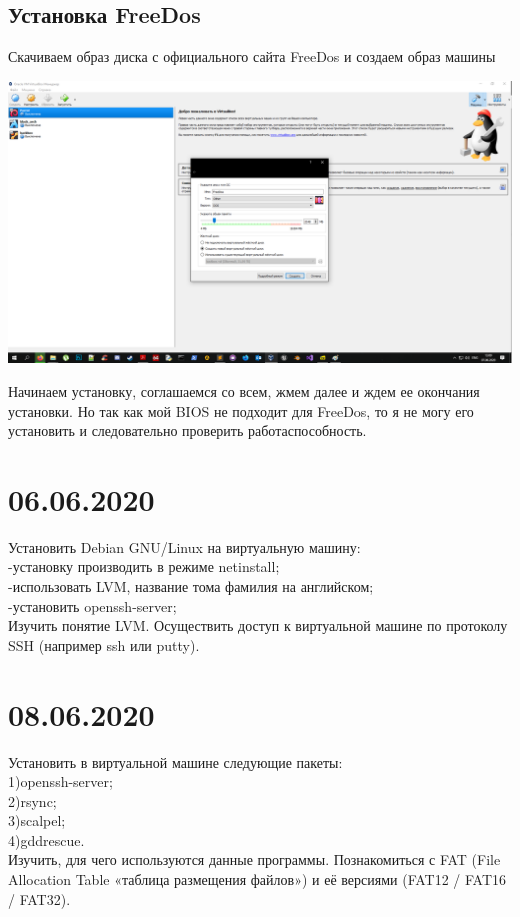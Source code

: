 \documentclass[a4paper,14pt]{extarticle}
\begin{document}
\subsection{Установка FreeDos}
Скачиваем образ диска с официального сайта FreeDos\cite{freedos} и создаем образ машины
\begin{center}
  \includegraphics[scale=0.3]{img/Freedos1.png}
\end{center}
Начинаем установку, соглашаемся со всем, жмем далее и ждем ее окончания установки.
Но так как мой BIOS не подходит для FreeDos, то я не могу его установить и следовательно проверить работаспособность.
\newpage
\section{06.06.2020}
Установить Debian GNU/Linux на виртуальную машину:\\
-установку производить в режиме netinstall;\\
-использовать LVM, название тома фамилия на английском;\\
-установить openssh-server;\\

Изучить понятие LVM. Осуществить доступ к виртуальной машине по протоколу SSH (например ssh или putty).
\section{08.06.2020}
Установить в виртуальной машине следующие пакеты:\\
        1)openssh-server;\\
        2)rsync;\\
        3)scalpel;\\
        4)gddrescue.\\

Изучить, для чего используются данные программы. Познакомиться с FAT (File Allocation Table «таблица размещения файлов») и её версиями (FAT12 / FAT16 / FAT32).
\end{document}
